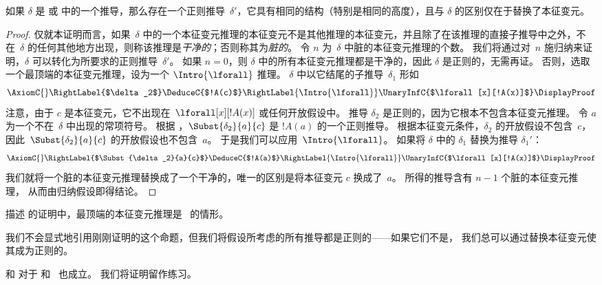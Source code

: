 \documentclass[../../../include/open-logic-section]{subfiles}
\begin{document}
\begin{prop}
如果 $\delta$ 是  或  中的一个推导，那么存在一个正则推导~$\delta'$，它具有相同的结构（特别是相同的高度），且与 $\delta$ 的区别仅在于替换了本征变元。
\end{prop}

\begin{proof}
仅就本证明而言，如果~$\delta$ 中的一个本征变元推理的本征变元不是其他推理的本征变元，并且除了在该推理的直接子推导中之外，不在~$\delta$ 的任何其他地方出现，则称该推理是\emph{干净的}；否则称其为\emph{脏的}。
令 $n$ 为~$\delta$ 中脏的本征变元推理的个数。
我们将通过对~$n$ 施归纳来证明，$\delta$ 可以转化为所要求的正则推导~$\delta'$。
如果 $n=0$，则 $\delta$ 中的所有本征变元推理都是干净的，因此 $\delta$ 是正则的，无需再证。
否则，选取一个最顶端的本征变元推理，设为一个 $\Intro{\lforall}$ 推理。
$\delta$ 中以它结尾的子推导~$\delta_1$ 形如
    \[
    \AxiomC{}
    \RightLabel{$\delta_2$}
    \DeduceC{$!A(c)$}
    \RightLabel{\Intro{\lforall}}
    \UnaryInfC{$\lforall[x][!A(x)]$}
    \DisplayProof
    \]
注意，由于 $c$ 是本征变元，它不出现在~$\lforall[x][!A(x)]$ 或任何开放假设中。
推导 $\delta_2$ 是正则的，因为它根本不包含本征变元推理。
令 $a$ 为一个不在~$\delta$ 中出现的常项符号。
根据 ，$\Subst{\delta_2}{a}{c}$ 是 $!A(a)$ 的一个正则推导。
根据本征变元条件，$\delta_2$ 的开放假设不包含~$c$，
因此~$\Subst{\delta_2}{a}{c}$ 的开放假设也不包含~$a$。
于是我们可以应用~$\Intro{\lforall}$。
如果将 $\delta$ 中的 $\delta_1$ 替换为推导 $\delta_1'$：
    \[
    \AxiomC{}
    \RightLabel{$\Subst{\delta_2}{a}{c}$}
    \DeduceC{$!A(a)$}
    \RightLabel{\Intro{\lforall}}
    \UnaryInfC{$\lforall[x][!A(x)]$}
    \DisplayProof
    \]
我们就将一个脏的本征变元推理替换成了一个干净的，唯一的区别是将本征变元 $c$ 换成了~$a$。
所得的推导含有 $n-1$ 个脏的本征变元推理，
从而由归纳假设即得结论。
\end{proof}

\begin{prob}
描述  的证明中，最顶端的本征变元推理是~\Elim{\lexists} 的情形。
\end{prob}

我们不会显式地引用刚刚证明的这个命题，但我们将假设所考虑的所有推导都是正则的——如果它们不是，
我们总可以通过替换本征变元使其成为正则的。

 和  对于  和~ 也成立。
我们将证明留作练习。
\end{document}
